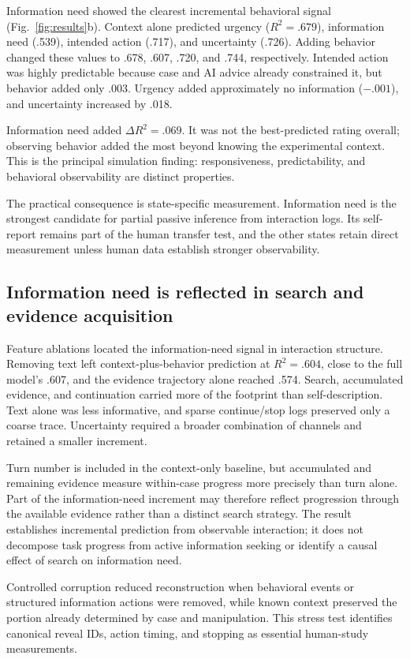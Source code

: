 \documentclass{article}
\begin{document}
Information need showed the clearest incremental behavioral signal (Fig.~\ref{fig:results}b). Context alone predicted urgency ($R^2=.679$), information need (.539), intended action (.717), and uncertainty (.726). Adding behavior changed these values to .678, .607, .720, and .744, respectively. Intended action was highly predictable because case and AI advice already constrained it, but behavior added only .003. Urgency added approximately no information ($-.001$), and uncertainty increased by .018.

Information need added $\Delta R^2=.069$. It was not the best-predicted rating overall; observing behavior added the most beyond knowing the experimental context. This is the principal simulation finding: responsiveness, predictability, and behavioral observability are distinct properties.

The practical consequence is state-specific measurement. Information need is the strongest candidate for partial passive inference from interaction logs. Its self-report remains part of the human transfer test, and the other states retain direct measurement unless human data establish stronger observability.

\subsection{Information need is reflected in search and evidence acquisition}

Feature ablations located the information-need signal in interaction structure. Removing text left context-plus-behavior prediction at $R^2=.604$, close to the full model's .607, and the evidence trajectory alone reached .574. Search, accumulated evidence, and continuation carried more of the footprint than self-description. Text alone was less informative, and sparse continue/stop logs preserved only a coarse trace. Uncertainty required a broader combination of channels and retained a smaller increment.

Turn number is included in the context-only baseline, but accumulated and remaining evidence measure within-case progress more precisely than turn alone. Part of the information-need increment may therefore reflect progression through the available evidence rather than a distinct search strategy. The result establishes incremental prediction from observable interaction; it does not decompose task progress from active information seeking or identify a causal effect of search on information need.

Controlled corruption reduced reconstruction when behavioral events or structured information actions were removed, while known context preserved the portion already determined by case and manipulation. This stress test identifies canonical reveal IDs, action timing, and stopping as essential human-study measurements.
\end{document}
